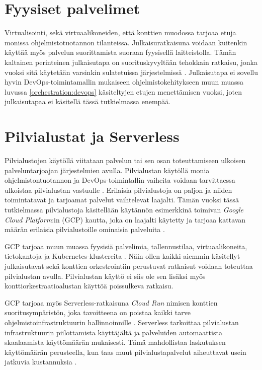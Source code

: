 \section{Fyysiset palvelimet}

Virtualisointi, sekä virtuaalikoneiden, että konttien muodossa tarjoaa etuja monissa ohjelmistotuotannon tilanteissa.
Julkaisuratkaisuna voidaan kuitenkin käyttää myös palvelun suorittamista suoraan fyysisellä laitteistolla.
Tämän kaltainen perinteinen julkaisutapa on suorituskyvyltään tehokkain ratkaisu, jonka vuoksi sitä käytetään varsinkin sulatetuissa järjestelmissä \cite{Heiser08}.
Julkaisutapa ei sovellu hyvin DevOps-toimintamallin mukaiseen ohjelmistokehitykseen muun muassa luvussa \ref{orchestration:devops} käsiteltyjen etujen menettämisen vuoksi, joten julkaisutapaa ei käsitellä tässä tutkielmassa enempää.


\section{Pilvialustat ja Serverless}

Pilvialustojen käytöllä viitataan palvelun tai sen osan toteuttamiseen ulkoisen palveluntarjoajan järjestelmien avulla.
Pilvialustan käytöllä monia ohjelmistontuotannon ja DevOps-toimintallin vaiheita voidaan tarvittaessa ulkoistaa pilvialustan vastuulle \cite{tomarchio20}.
Erilaisia pilvialustoja on paljon ja niiden toimintatavat ja tarjoamat palvelut vaihtelevat laajalti.
Tämän vuoksi tässä tutkielmassa pilvialustoja käsitellään käytännön esimerkkinä toimivan \textit{Google Cloud Platform}:in (GCP) kautta, joka on laajalti käytetty ja tarjoaa kattavan määrän erilaisia pilvialustoille ominaisia palveluita \cite{ahuja20}.

GCP tarjoaa muun muassa fyysisiä palvelimia, tallennustilaa, virtuaalikoneita, tietokantoja ja Kubernetes-klustereita \cite{Products23}.
Näin ollen kaikki aiemmin käsitellyt julkaisutavat sekä konttien orkestrointiin perustuvat ratkaisut voidaan toteuttaa pilvialustan avulla.
Pilvialustan käyttö ei siis ole sen lisäksi myös konttiorkestraatioalustan käyttöä poissulkeva ratkaisu.

GCP tarjoaa myös Serverless-ratkaisuna \textit{Cloud Run} nimisen konttien suoritusympäristön, joka tavoitteena on poistaa kaikki tarve ohjelmistoinfrastruktuurin hallinnoinnille \cite{Products23}.
Serverless tarkoittaa pilvialustan infrastruktuurin piilottamista käyttäjältä ja palveluiden automaattista skaalaamista käyttömäärän mukaisesti.
Tämä mahdollistaa laskutuksen käyttömäärän perusteella, kun taas muut pilvialustapalvelut aiheuttavat usein jatkuvia kustannuksia \cite{shafiei22}.

